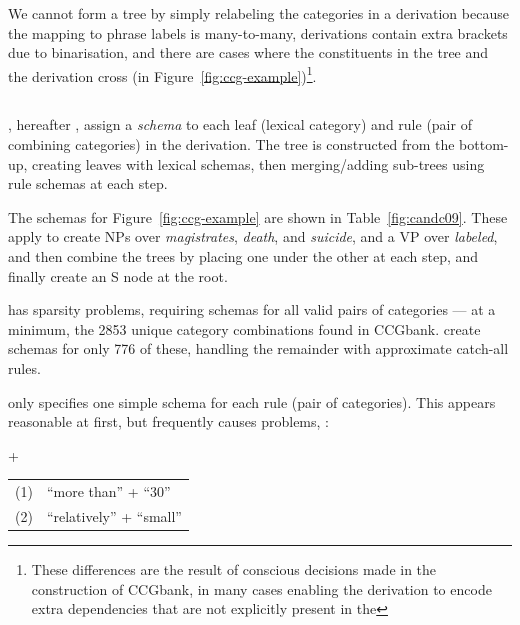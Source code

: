 We cannot form a \ptb tree by simply relabeling the categories in a \ccg derivation because the mapping to phrase labels is many-to-many, \ccg derivations contain extra brackets due to binarisation, and there are cases where the constituents in the \ptb tree and the \ccg derivation cross (\myeg in Figure~\ref{fig:ccg-example})\footnote{These differences are the result of conscious decisions made in the construction of CCGbank, in many cases enabling the derivation to encode extra dependencies that are not explicitly present in the \ptb}.

\subsection{\textcite{Clark-Curran:2009}}

\textcite{Clark-Curran:2009}, hereafter \old, assign a {\em schema} to each
leaf (lexical category) and rule (pair of combining categories) in the \ccg derivation.
The \ptb tree is constructed from the \ccg bottom-up, creating leaves with
lexical schemas, then merging/adding sub-trees using rule schemas at each step.

The schemas for Figure~\ref{fig:ccg-example} are shown in Table~\ref{fig:candc09}.
These apply to create NPs over \textit{magistrates}, \textit{death}, and
\textit{suicide}, and a VP over \textit{labeled}, and then combine the trees by
placing one under the other at each step, and finally create an S node at the
root.

\old has sparsity problems, requiring schemas for all valid pairs of
categories --- at a minimum, the 2853 unique category combinations found in
CCGbank. \textcite{Clark-Curran:2009} create schemas for only 776 of these,
handling the remainder with approximate catch-all rules.

\old only specifies one simple schema for each rule (pair of
categories).  This appears reasonable at first, but frequently causes
problems, \myeg:

\begin{center}
 +  \\
\begin{tabular}{ll}
  (1) & ``more than'' + ``30'' \\ %
  (2) & ``relatively'' + ``small'' \\ %
\end{tabular}
\end{center}


